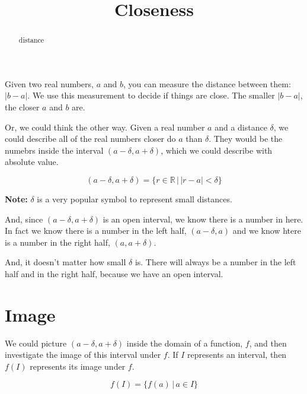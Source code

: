 \documentclass{ximera}
\title{Closeness}
\begin{document}
\begin{abstract}
distance
\end{abstract}
\maketitle










Given two real numbers, $a$ and $b$, you can measure the distance between them: $|b-a|$.  We use this measurement to decide if things are close.  The smaller $|b-a|$, the closer $a$ and $b$ are.


Or, we could think the other way.  Given a real number $a$ and a distance $\delta$, we could describe all of the real numbers closer do $a$ than $\delta$.  They would be the numebrs inside the interval $(a-\delta, a+\delta)$, which we could describe with absolute value.

\[      (a-\delta, a+\delta) = \{ r \in \mathbb{R} \, | \, |r - a| < \delta        \}       \]


\textbf{Note:}  $\delta$ is a very popular symbol to represent small distances.



And, since $(a-\delta, a+\delta)$ is an open interval, we know there is a number in here.  In fact we know there is a number in the left half, $(a-\delta, a)$ and we know htere is a number in the right half, $(a, a+\delta)$.


And, it doesn't matter how small $\delta$ is.  There will always be a number in the left half and in the right half, because we have an open interval.



\section{Image}


We could picture $(a-\delta, a+\delta)$ inside the domain of a function, $f$, and then investigate the image of this interval under $f$.  If $I$ represents an interval, then $f(I)$ represents its image under $f$.


\[       f(I) = \{   f(a)  \, | \, a \in I            \}             \]
\end{document}
